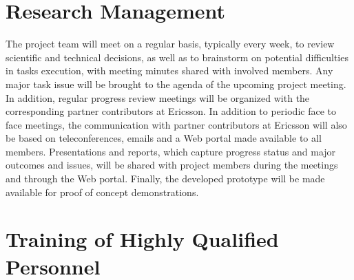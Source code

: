 \documentclass[12pt]{article}
\begin{document}
\vspace{-3mm}
\section{Research Management}
\vspace{-2mm}


The project team will meet on a regular basis, typically every week,
to review scientific and technical decisions, as well as to brainstorm
on potential difficulties in tasks execution, with meeting minutes
shared with involved members. Any major task issue will be brought to
the agenda of the upcoming project meeting. In addition, regular
progress review meetings will be organized with the corresponding
partner contributors at Ericsson.  In addition to periodic face to
face meetings, the communication with partner contributors at Ericsson
will also be based on teleconferences, emails and a Web portal made
available to all members. Presentations and reports, which capture
progress status and major outcomes and issues, will be shared with
project members during the meetings and through the Web
portal. Finally, the developed prototype will be made available for
proof of concept demonstrations.


\vspace{-3mm}
\section{Training of Highly Qualified Personnel}
\vspace{-2mm}
\end{document}
